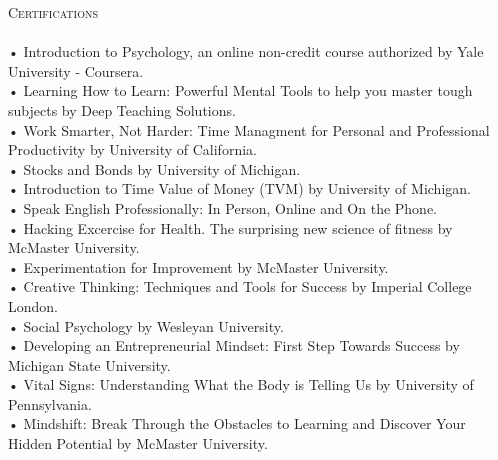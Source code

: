 \documentclass[a4paper]{article}
\newcommand{\lineunder} {
    \vspace*{-8pt} \\
    \hspace*{-18pt} \hrulefill \\
}
\newcommand{\header} [1] {
    {\hspace*{-18pt}\vspace*{6pt} \textsc{#1}}
    \vspace*{-6pt} \lineunder
}
\begin{document}
      \header{Certifications}
      \vspace{2mm}
\vspace*{1mm}
      • Introduction to Psychology, an online non-credit course authorized by Yale University - Coursera.\\
\vspace*{1mm}
      • Learning How to Learn: Powerful Mental Tools to help you master tough subjects by Deep Teaching Solutions.\\
\vspace*{1mm}
      • Work Smarter, Not Harder: Time Managment for Personal and Professional Productivity by University of California.\\
\vspace*{1mm}
      • Stocks and Bonds by University of Michigan.\\
\vspace*{1mm}
      • Introduction to Time Value of Money (TVM) by University of Michigan.\\
\vspace*{1mm}
      • Speak English Professionally: In Person, Online and On the Phone.\\
\vspace*{1mm}
      • Hacking Excercise for Health. The surprising new science of fitness by McMaster University.\\
\vspace*{1mm}
      • Experimentation for Improvement by McMaster University.\\
\vspace*{1mm}
      • Creative Thinking: Techniques and Tools for Success by Imperial College London.\\
\vspace*{1mm}
      • Social Psychology by Wesleyan University.\\
\vspace*{1mm}
      • Developing an Entrepreneurial Mindset: First Step Towards Success by Michigan State University.\\
\vspace*{1mm}
      • Vital Signs: Understanding What the Body is Telling Us by University of Pennsylvania.\\
\vspace*{1mm}
      • Mindshift: Break Through the Obstacles to Learning and Discover Your Hidden Potential by McMaster University.\\
      \vspace{2mm}
\end{document}
